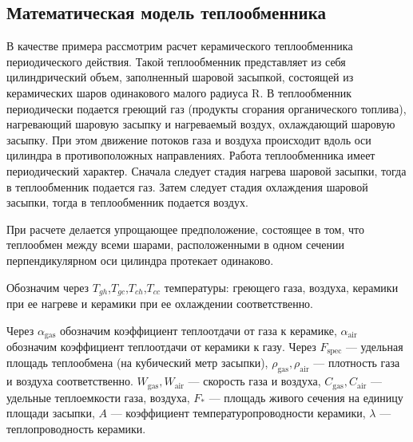 \documentclass[a4paper,11pt,numreferences,mathsec,kaplist]{isuepsutf8}
\begin{document}
\begin{article}
\section{Математическая модель теплообменника}

В качестве примера рассмотрим расчет керамического теплообменника
периодического действия. Такой теплообменник представляет из себя
цилиндрический объем, заполненный шаровой засыпкой, состоящей из
керамических шаров одинакового малого радиуса R. В теплообменник
периодически подается греющий газ (продукты сгорания органического
топлива), нагревающий шаровую засыпку и нагреваемый воздух, охлаждающий
шаровую засыпку. При этом движение потоков газа и воздуха происходит вдоль
оси цилиндра в противоположных направлениях. Работа теплообменника имеет
периодический характер. Сначала следует стадия нагрева шаровой засыпки,
тогда в теплообменник подается газ. Затем следует стадия охлаждения шаровой
засыпки, тогда в теплообменник подается воздух.

При расчете делается упрощающее предположение, состоящее в том, что
теплообмен между всеми шарами, расположенными в одном сечении
перпендикулярном оси цилиндра протекает одинаково.

Обозначим через $T_{gh}$,$T_{gc}$,$T_{ch}$,$T_{cc}$ температуры: греющего
газа, воздуха, керамики при ее нагреве и керамики при ее охлаждении
соответственно.

Через $\alpha_{\text{gas}}$ обозначим коэффициент теплоотдачи от газа к
керамике, $\alpha_{\text{air}}$ обозначим коэффициент теплоотдачи от
керамики к газу. Через $F_{\text{spec}}$  --- удельная площадь теплообмена
(на кубический метр
засыпки), $\rho_{\text{gas}}, \rho_{\text{air}}$ --- плотность газа и воздуха
соответственно. $W_{\text{gas}},W_{\text{air}}$ --- скорость газа и
воздуха, $C_{\text{gas}},C_{\text{air}}$ --- удельные теплоемкости газа,
воздуха, $F_{*}$ --- площадь живого сечения
на единицу площади засыпки, $A$ --- коэффициент температуропроводности керамики,
$\lambda$ --- теплопроводность керамики.


\end{article}
\end{document}
